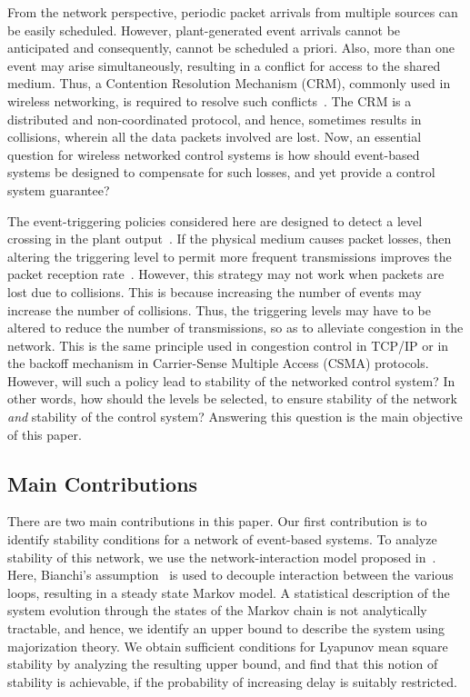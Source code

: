 \documentclass[twocolumn]{autart}
\begin{document}
From the network perspective, periodic packet arrivals from multiple sources can be easily scheduled. However, plant-generated event arrivals cannot be anticipated and consequently, cannot be scheduled a priori. Also, more than one event may arise simultaneously, resulting in a conflict for access to the shared medium. Thus, a Contention Resolution Mechanism (CRM), commonly used in wireless networking, is required to resolve such conflicts~\cite{Rom1990}. The CRM is a distributed and non-coordinated protocol, and hence, sometimes results in collisions, wherein all the data packets involved are lost. Now, an essential question for wireless networked control systems is how should event-based systems be designed to compensate for such losses, and yet provide a control system guarantee?

The event-triggering policies considered here are designed to detect a level crossing in the plant output~\cite{Rabi2006}. If the physical medium causes packet losses, then altering the triggering level to permit more frequent transmissions improves the packet reception rate~\cite{Rabi2009}. However, this strategy may not work when packets are lost due to collisions. This is because increasing the number of events may increase the number of collisions. Thus, the triggering levels may have to be altered to reduce the number of transmissions, so as to alleviate congestion in the network. This is the same principle used in congestion control in TCP/IP or in the backoff mechanism in Carrier-Sense Multiple Access (CSMA) protocols. However, will such a policy lead to stability of the networked control system? In other words, how should the levels be selected, to ensure stability of the network \emph{and} stability of the control system? Answering this question is the main objective of this paper.

\subsection{Main Contributions}
There are two main contributions in this paper. Our first contribution is to identify stability conditions for a network of event-based systems. To analyze stability of this network, we use the network-interaction model proposed in~\cite{Ramesh2011b}. Here, Bianchi's assumption~\cite{Bianchi2000} is used to decouple interaction between the various loops, resulting in a steady state Markov model. A statistical description of the system evolution through the states of the Markov chain is not analytically tractable, and hence, we identify an upper bound to describe the system using majorization theory. We obtain sufficient conditions for Lyapunov mean square stability by analyzing the resulting upper bound, and find that this notion of stability is achievable, if the probability of increasing delay is suitably restricted.
\end{document}
